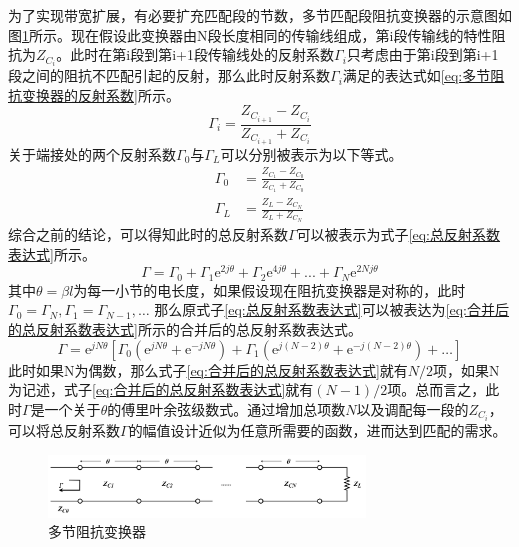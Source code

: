 \documentclass[master]{thesis-uestc}
\begin{document}
为了实现带宽扩展，有必要扩充匹配段的节数，多节匹配段阻抗变换器的示意图如图\ref{fig:多节阻抗变换器}所示。现在假设此变换器由N段长度相同的传输线组成，第i段传输线的特性阻抗为\(Z_{C_i}\)。此时在第i段到第i+1段传输线处的反射系数\(\Gamma_i\)只考虑由于第i段到第i+1段之间的阻抗不匹配引起的反射，那么此时反射系数\(\Gamma_i\)满足的表达式如\ref{eq:多节阻抗变换器的反射系数}所示。
\begin{equation}\label{eq:多节阻抗变换器的反射系数}
    \Gamma_i = \frac{Z_{C_{i+1}}-Z_{C_{i}}}{Z_{C_{i+1}}+Z_{C_{i}}}
\end{equation}
关于端接处的两个反射系数\(\Gamma_0\)与\(\Gamma_L\)可以分别被表示为以下等式\label{eq:端接处的反射系数}。
\begin{subequations}\label{eq:端接处的反射系数}
    \begin{align}
        \Gamma_0 &= \frac{Z_{C_1}-Z_{C_0}}{Z_{C_1}+Z_{C_0}} \\
        \Gamma_L &= \frac{Z_L-Z_{C_N}}{Z_L+Z_{C_N}}
    \end{align}
\end{subequations}
综合之前的结论，可以得知此时的总反射系数\(\Gamma\)可以被表示为式子\ref{eq:总反射系数表达式}所示。
\begin{equation}\label{eq:总反射系数表达式}
    \Gamma = \Gamma_0+\Gamma_1 \mathrm{e}^{2 j \theta}+\Gamma_2 \mathrm{e}^{4 j \theta}+...+\Gamma_N \mathrm{e}^{2 N j \theta}
\end{equation}
其中\(\theta = \beta l\)为每一小节的电长度，如果假设现在阻抗变换器是对称的，此时\(\Gamma_0 = \Gamma_N, \Gamma_1 = \Gamma_{N-1}, \dots \)
那么原式子\ref{eq:总反射系数表达式}可以被表达为\ref{eq:合并后的总反射系数表达式}所示的合并后的总反射系数表达式。
\begin{equation}\label{eq:合并后的总反射系数表达式}
    \Gamma = \mathrm{e}^{j  N \theta} \left[\Gamma_0\left(\mathrm{e}^{j N \theta}+\mathrm{e}^{- j N \theta} \right) + \Gamma_1\left(\mathrm{e}^{j (N-2) \theta}+\mathrm{e}^{- j (N-2) \theta} \right) + \dots \right]
\end{equation}
此时如果N为偶数，那么式子\ref{eq:合并后的总反射系数表达式}就有\(N/2\)项，如果N为记述，式子\ref{eq:合并后的总反射系数表达式}就有\((N-1)/2\)项。总而言之，此时\(\Gamma\)是一个关于\(\theta\)的傅里叶余弦级数式。通过增加总项数\(N\)以及调配每一段的\(Z_{C_i}\)，可以将总反射系数\(\Gamma\)的幅值设计近似为任意所需要的函数，进而达到匹配的需求。
\begin{figure}[!htb]
    \centering
    \includegraphics[width=0.75\textwidth]{pic/chapter2/多节阻抗匹配示意图.png}
    \caption{多节阻抗变换器}
    \label{fig:多节阻抗变换器}
\end{figure}
\end{document}
